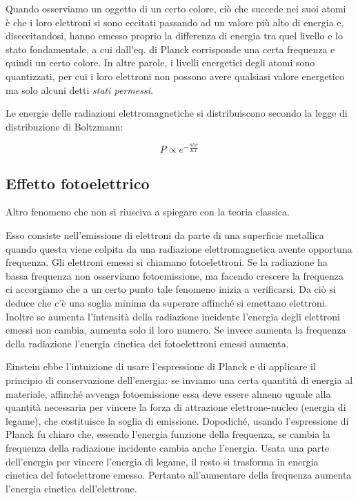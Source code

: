 Quando osserviamo un oggetto di un certo colore, ciò che succede nei suoi atomi è che i loro elettroni si sono eccitati passando ad un valore più alto di energia e, diseccitandosi, hanno emesso proprio la differenza di energia tra quel livello e lo stato fondamentale, a cui dall'eq. di Planck corrisponde una certa frequenza e quindi un certo colore. In altre parole, i livelli energetici degli atomi sono quantizzati, per cui i loro elettroni non possono avere qualsiasi valore energetico ma solo alcuni detti \textit{stati permessi}.

Le energie delle radiazioni elettromagnetiche si distribuiscono secondo la legge di distribuzione di Boltzmann:

$$P\propto e^{{-\frac{nh\nu}{KT}}}$$

\subsection{Effetto fotoelettrico}
Altro fenomeno che non si riusciva a spiegare con la teoria classica.

Esso consiste nell'emissione di elettroni da parte di una superficie metallica quando questa viene colpita da una radiazione elettromagnetica avente opportuna frequenza. Gli elettroni emessi si chiamano fotoelettroni.
Se la radiazione ha bassa frequenza non osserviamo fotoemissione, ma facendo crescere la frequenza ci accorgiamo che a un certo punto tale fenomeno inizia a verificarsi. Da ciò si deduce che c'è una soglia minima da superare affinché si emettano elettroni. Inoltre se aumenta l'intensità della radiazione incidente l'energia degli elettroni emessi non cambia, aumenta solo il loro numero. Se invece aumenta la frequenza della radiazione l'energia cinetica dei fotoelettroni emessi aumenta.

Einstein ebbe l'intuizione di usare l'espressione di Planck e di applicare il principio di conservazione dell'energia: se inviamo una certa quantità di energia al materiale, affinché avvenga fotoemissione essa deve essere almeno uguale alla quantità necessaria per vincere la forza di attrazione elettrone-nucleo (energia di legame), che costituisce la soglia di emissione. Dopodiché, usando l'espressione di Planck fu chiaro che, essendo l'energia funzione della frequenza, se cambia la frequenza della radiazione incidente cambia anche l'energia. Usata una parte dell'energia per vincere l'energia di legame, il resto si trasforma in energia cinetica del fotoelettrone emesso.
Pertanto all'aumentare della frequenza aumenta l'energia cinetica dell'elettrone.


